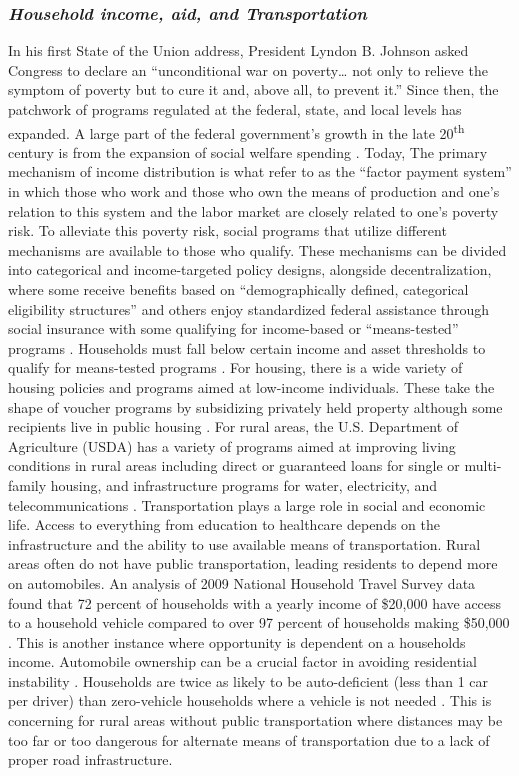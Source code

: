 \subsubsection{\textit{Household income, aid, and Transportation}}
In his first State of the Union address, President Lyndon B. Johnson asked Congress to declare an “unconditional war on poverty… not only to relieve the symptom of poverty but to cure it and, above all, to prevent it.” %
Since then, the patchwork of programs regulated at the federal, state, and local levels has expanded. A large part of the federal government's growth in the late 20\textsuperscript{th} century is from the expansion of social welfare spending \citep{fishback_social_2020}. Today, The primary mechanism of income distribution is what \citet{berkowitz_gaps_2023} refer to as the “factor payment system” in which those who work and those who own the means of production and one’s relation to this system and the labor market are closely related to one’s poverty risk. To alleviate this poverty risk, social programs that utilize different mechanisms are available to those who qualify. These mechanisms can be divided into categorical and income-targeted policy designs, alongside decentralization, where some receive benefits based on “demographically defined, categorical eligibility structures” and others enjoy standardized federal assistance through social insurance with some qualifying for income-based or “means-tested” programs \citep{bruch_poverty_2023}. Households must fall below certain income and asset thresholds to qualify for means-tested programs \citep{rank_welfare_2002}. For housing, there is a wide variety of housing policies and programs aimed at low-income individuals. These take the shape of voucher programs by subsidizing privately held property although some recipients live in public housing \citep{kim_housing_2017}. For rural areas, the U.S. Department of Agriculture (USDA) has a variety of programs aimed at improving living conditions in rural areas including direct or guaranteed loans for single or multi-family housing, and infrastructure programs for water, electricity, and telecommunications \citep{noauthor_usda_2023}. Transportation plays a large role in social and economic life. Access to everything from education to healthcare depends on the infrastructure and the ability to use available means of transportation. Rural areas often do not have public transportation, leading residents to depend more on automobiles. An analysis of 2009 National Household Travel Survey data found that 72 percent of households with a yearly income of \$20,000 have access to a household vehicle compared to over 97 percent of households making \$50,000 \citep{blumenberg_automobile_2012}. This is another instance where opportunity is dependent on a households income. Automobile ownership can be a crucial factor in avoiding residential instability \citep{kang_why_2019}. Households are twice as likely to be auto-deficient (less than 1 car per driver) than zero-vehicle households where a vehicle is not needed \citep{blumenberg_car-deficit_2020}. This is concerning for rural areas without public transportation where distances may be too far or too dangerous for alternate means of transportation due to a lack of proper road infrastructure.
 
